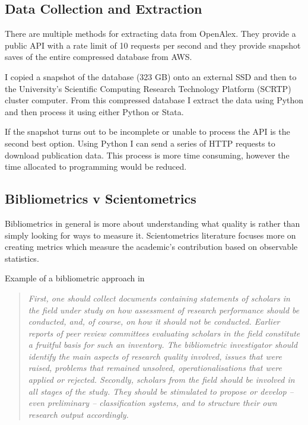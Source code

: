 \documentclass[10pt]{report}
\begin{document}
\subsection*{Data Collection and Extraction}

There are multiple methods for extracting data from OpenAlex. They provide a public API with a rate limit of 10 requests per second and they provide snapshot saves of the entire compressed database from AWS.

I copied a snapshot of the database (323 GB) onto an external SSD and then to the University's Scientific Computing Research Technology Platform (SCRTP) cluster computer. From this compressed database I extract the data using Python and then process it using either Python or Stata.

If the snapshot turns out to be incomplete or unable to process the API is the second best option. Using Python I can send a series of HTTP requests to download publication data. This process is more time consuming, however the time allocated to programming would be reduced.

\subsection*{Bibliometrics v Scientometrics}
\label{ssec:bibvscient}

Bibliometrics in general is more about understanding what quality is rather than simply looking for ways to measure it. Scientometrics literature focuses more on creating metrics which measure the academic's contribution based on observable statistics.


Example of a bibliometric approach in \textcite[p. 151]{Moed2006}
\begin{quote}
\textit{First, one should collect documents containing statements
of scholars in the field under study on how assessment of research
performance should be conducted, and, of course, on how it should not be
conducted. Earlier reports of peer review committees evaluating scholars in
the field constitute a fruitful basis for such an inventory. The bibliometric
investigator should identify the main aspects of research quality involved,
issues that were raised, problems that remained unsolved, operationalisations
that were applied or rejected. Secondly, scholars from the field should be
involved in all stages of the study. They should be stimulated to propose or
develop – even preliminary – classification systems, and to structure their
own research output accordingly.}

\end{quote}
\end{document}
